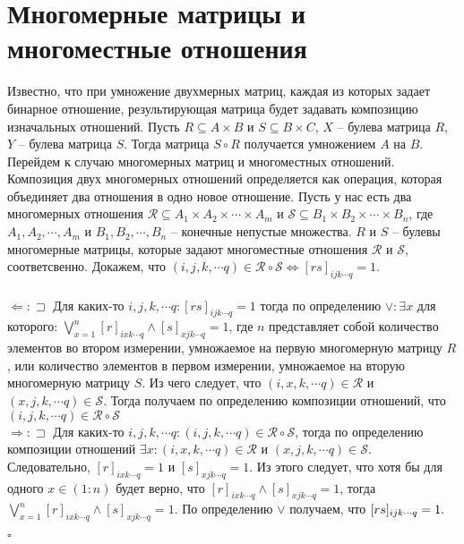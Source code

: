 \documentclass{article}
\begin{document}
\section{Многомерные матрицы и многоместные отношения}
Известно, что при умножение двухмерных матриц, каждая из которых задает бинарное отношение, результирующая матрица будет задавать композицию изначальных отношений. 
Пусть $R \subseteq A \times B$ и $S \subseteq B \times C$, $X$ -- булева матрица $R$, $Y$ -- булева матрица $S$. Тогда матрица $S \circ R $ получается умножением $A$ на $B$.
\\

Перейдем к случаю многомерных матриц и многоместных отношений. Композиция двух многомерных отношений определяется как операция, которая объединяет два отношения в одно новое отношение. Пусть у нас есть два многомерных отношения $\mathcal{R} \subseteq A_1 \times A_2 \times \cdots \times A_m$ и $\mathcal{S} \subseteq B_1 \times B_2 \times \cdots \times B_n$, где $A_1, A_2, \cdots, A_m$ и $B_1, B_2, \cdots, B_n$ -- конечные непустые множества. $R$ и $S$ -- булевы многомерные матрицы, которые задают многоместные отношения $\mathcal{R}$ и $\mathcal{S}$, соответсвенно. Докажем, что $(i,j,k, \cdots q) \in \mathcal{R} \circ \mathcal{S} \iff [rs]_{i j k\cdots q} = 1$.\\\\
$\Leftarrow :  \sqsupset$ Для каких-то $i, j, k, \cdots q : [rs]_{ijk\cdots q} = 1$ тогда по определению $\vee : \exists x$ для которого: $\bigvee_{x=1}^n [r]_{ixk\cdots q} \wedge [s]_{xjk\cdots q} = 1$, где $n$ представляет собой количество элементов во втором измерении, умножаемое на первую многомерную матрицу $R$, или количество элементов в первом измерении, умножаемое на вторую многомерную матрицу $S$. Из чего следует, что $(i,x,k, \cdots q) \in \mathcal{R}$ и $(x,j,k,\cdots q) \in \mathcal{S}$. Тогда получаем по определению композиции отношений, что $(i,j,k, \cdots q) \in \mathcal{R} \circ \mathcal{S}$ \\
$\Rightarrow : \sqsupset$ Для каких-то $i, j, k, \cdots q : (i,j,k, \cdots q) \in \mathcal{R} \circ \mathcal{S}$, тогда по определению композиции отношений $\exists x: (i,x,k, \cdots q) \in \mathcal{R}$ и $(x,j,k,\cdots q) \in \mathcal{S}$. Следовательно, $[r]_{ixk\cdots q} = 1$ и $[s]_{xjk\cdots q} = 1$. Из этого следует, что хотя бы для одного $x \in (1:n)$ будет верно, что $[r]_{ixk\cdots q} \wedge [s]_{xjk\cdots q} = 1$, тогда $\bigvee_{x=1}^n [r]_{ixk\cdots q} \wedge [s]_{xjk\cdots q} = 1$. По определению $\vee$ получаем, что $[rs]_{i j k\cdots q} = 1.\\$
\begin{flushright}
$\square$
\end{flushright}
\\
\end{document}

